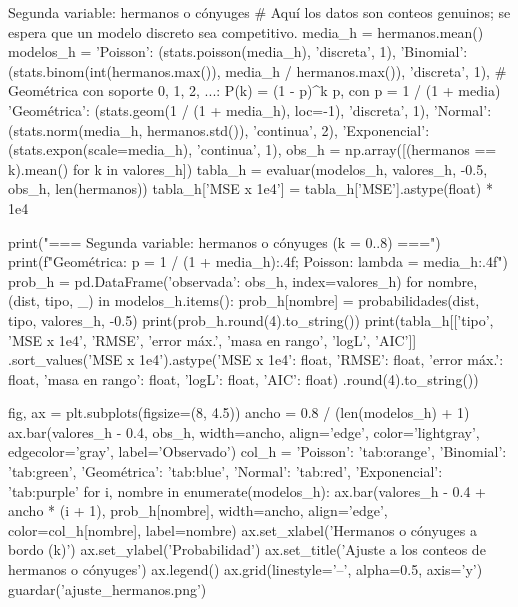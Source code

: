 \documentclass[11pt,letterpaper]{article}
\begin{document}
\begin{codigo}[label=cod:t5]{Segunda variable: hermanos o cónyuges}
# Aquí los datos son conteos genuinos; se espera que un modelo discreto sea competitivo.
media_h = hermanos.mean()
modelos_h = {
    'Poisson':     (stats.poisson(media_h), 'discreta', 1),
    'Binomial':    (stats.binom(int(hermanos.max()), media_h / hermanos.max()), 'discreta', 1),
    # Geométrica con soporte 0, 1, 2, ...: P(k) = (1 - p)^k p, con p = 1 / (1 + media)
    'Geométrica':  (stats.geom(1 / (1 + media_h), loc=-1), 'discreta', 1),
    'Normal':      (stats.norm(media_h, hermanos.std()), 'continua', 2),
    'Exponencial': (stats.expon(scale=media_h), 'continua', 1),
}
obs_h = np.array([(hermanos == k).mean() for k in valores_h])
tabla_h = evaluar(modelos_h, valores_h, -0.5, obs_h, len(hermanos))
tabla_h['MSE x 1e4'] = tabla_h['MSE'].astype(float) * 1e4

print("\n=== Segunda variable: hermanos o cónyuges (k = 0..8) ===")
print(f"Geométrica: p = {1 / (1 + media_h):.4f}; Poisson: lambda = {media_h:.4f}")
prob_h = pd.DataFrame({'observada': obs_h}, index=valores_h)
for nombre, (dist, tipo, _) in modelos_h.items():
    prob_h[nombre] = probabilidades(dist, tipo, valores_h, -0.5)
print(prob_h.round(4).to_string())
print(tabla_h[['tipo', 'MSE x 1e4', 'RMSE', 'error máx.', 'masa en rango', 'logL', 'AIC']]
      .sort_values('MSE x 1e4').astype({'MSE x 1e4': float, 'RMSE': float, 'error máx.': float,
                                        'masa en rango': float, 'logL': float, 'AIC': float})
      .round(4).to_string())

fig, ax = plt.subplots(figsize=(8, 4.5))
ancho = 0.8 / (len(modelos_h) + 1)
ax.bar(valores_h - 0.4, obs_h, width=ancho, align='edge', color='lightgray', edgecolor='gray',
       label='Observado')
col_h = {'Poisson': 'tab:orange', 'Binomial': 'tab:green', 'Geométrica': 'tab:blue',
         'Normal': 'tab:red', 'Exponencial': 'tab:purple'}
for i, nombre in enumerate(modelos_h):
    ax.bar(valores_h - 0.4 + ancho * (i + 1), prob_h[nombre], width=ancho, align='edge',
           color=col_h[nombre], label=nombre)
ax.set_xlabel('Hermanos o cónyuges a bordo (k)')
ax.set_ylabel('Probabilidad')
ax.set_title('Ajuste a los conteos de hermanos o cónyuges')
ax.legend()
ax.grid(linestyle='--', alpha=0.5, axis='y')
guardar('ajuste_hermanos.png')
\end{codigo}
\end{document}
